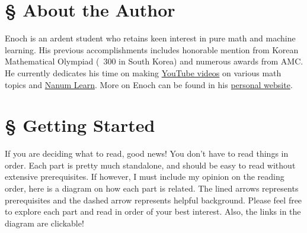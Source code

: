 \documentclass[../main.tex]{subfiles}
\begin{document}
\section*{\S\! About the Author}

Enoch is an ardent student who retains keen interest in pure math
and machine learning. His previous accomplishments includes honorable
mention from Korean Mathematical Olympiad (~300 in South Korea) and
numerous awards from AMC. He currently dedicates his time on making
\href{https://www.youtube.com/@enochness}{YouTube videos}
on various math topics and \href{https://nanumlearn.org}{Nanum Learn}.
More on Enoch can be found in his
\href{https://enochyu.com}{personal website}.

\section*{\S\! Getting Started}

If you are deciding what to read, good news! You don't have to read
things in order. Each part is pretty much standalone, and should be
easy to read without extensive prerequisites. If however, I must
include my opinion on the reading order, here is a diagram on how each
part is related. The lined arrows represents prerequisites and the
dashed arrow represents helpful background. Please feel free to
explore each part and read in order of your best interest. Also,
the links in the diagram are clickable!

\begin{figure}[H]
\centering
\tikzexternaldisable
{}
\tikzexternalenable
\end{figure}
\end{document}
